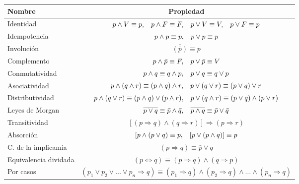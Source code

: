 \begingroup
\setlength{\tabcolsep}{6pt} %
\renewcommand{\arraystretch}{1.5} %
\begin{center}
\begin{tabular}{l|c}
\bf Nombre&\bf Propiedad\\ \hline
Identidad& $p \wedge V \equiv p, \hspace{0.3cm} p \wedge F \equiv F, \hspace{0.3cm} p \vee V \equiv V, \hspace{0.3cm} p \vee F \equiv p  $\\
Idempotencia& $p \wedge p \equiv p,\hspace{0.3cm} p \vee p \equiv p $\\
Involución& $\overline{( {\overline{p}} )} \equiv p$\\
Complemento&$p \wedge \bar{p} \equiv F,\hspace{0.3cm} p \vee \bar{p} \equiv V$\\
Conmutatividad&$ p \wedge q \equiv q \wedge p, \hspace{0.3cm} p \vee q \equiv q \vee p $\\
Asociatividad&$ p \wedge (q \wedge r) \equiv (p \wedge q) \wedge r, \hspace{0.3cm} p \vee (q \vee r) \equiv (p \vee q) \vee r$\\
Distributividad&$p \wedge (q \vee r) \equiv (p \wedge q) \vee (p \wedge r), \hspace{0.3cm}  p \vee (q \wedge r) \equiv (p \vee q) \wedge (p \vee r) $\\
Leyes de Morgan&$\overline{p \vee q} \equiv \bar{p} \wedge \bar{q}, \hspace{0.3cm} \overline{p \wedge q} \equiv \bar{p} \vee \bar{q}$\\
Transitividad&$[(p \Rightarrow q) \wedge (q \Rightarrow r)] \Rightarrow (p \Rightarrow r)$\\
Absorción&$[p \wedge ( p \vee q ) \equiv p, \hspace{0.3cm} [p \vee (p \wedge q)] \equiv p$\\
C. de la implicamia& $(p \Rightarrow q) \equiv \bar{p} \vee q$\\
Equivalencia dividada& $(p \Leftrightarrow q) \equiv (p \Rightarrow q) \wedge (q \Rightarrow p)$\\
Por casos& $(p_1 \vee p_2 \vee \dots \vee p_n \Rightarrow q) \equiv (p_1 \Rightarrow q) \wedge (p_2 \Rightarrow q) \wedge \dots \wedge (p_n \Rightarrow q)$
\end{tabular}

\end{center}
\endgroup